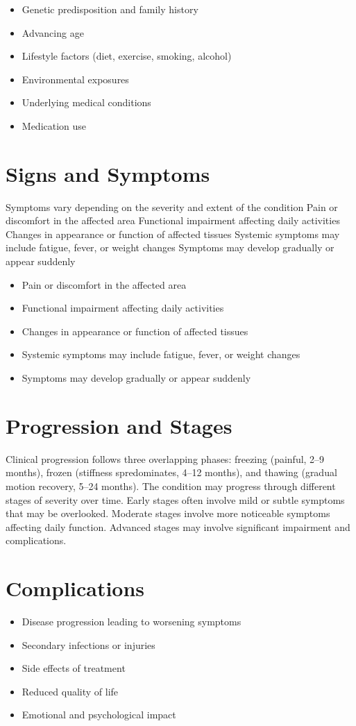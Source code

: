 \begin{itemize}[noitemsep]
  \item Genetic predisposition and family history
  \item Advancing age
  \item Lifestyle factors (diet, exercise, smoking, alcohol)
  \item Environmental exposures
  \item Underlying medical conditions
  \item Medication use
\end{itemize}
\section{Signs and Symptoms}
Symptoms vary depending on the severity and extent of the condition Pain or discomfort in the affected area Functional impairment affecting daily activities Changes in appearance or function of affected tissues Systemic symptoms may include fatigue, fever, or weight changes Symptoms may develop gradually or appear suddenly

\begin{itemize}[noitemsep]
  \item Pain or discomfort in the affected area
  \item Functional impairment affecting daily activities
  \item Changes in appearance or function of affected tissues
  \item Systemic symptoms may include fatigue, fever, or weight changes
  \item Symptoms may develop gradually or appear suddenly
\end{itemize}
\section{Progression and Stages}
Clinical progression follows three overlapping phases: freezing (painful, 2--9 months), frozen (stiffness spredominates, 4--12 months), and thawing (gradual motion recovery, 5--24 months). The condition may progress through different stages of severity over time. Early stages often involve mild or subtle symptoms that may be overlooked. Moderate stages involve more noticeable symptoms affecting daily function. Advanced stages may involve significant impairment and complications.
\section{Complications}
\begin{itemize}[noitemsep]
  \item Disease progression leading to worsening symptoms
  \item Secondary infections or injuries
  \item Side effects of treatment
  \item Reduced quality of life
  \item Emotional and psychological impact
\end{itemize}
